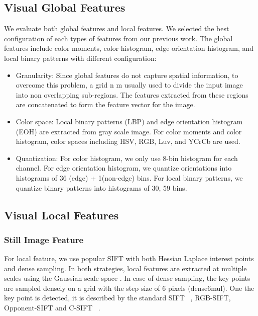 \documentclass[twocolumn]{bmcart}%
\begin{document}
\subsection{Visual Global Features}

We evaluate both global features and local features. We selected the best configuration of each types of features from our previous work\cite{lam2012nii}. The global features include color moments, color histogram, edge orientation histogram, and local binary patterns with different configuration:

\begin{itemize}
	\item Granularity:  Since global features do not capture spatial information, to overcome this problem, a grid n  m usually used to divide the input image into non overlapping sub-regions. The features extracted from these regions are concatenated to form the feature vector for the image.
	\item Color space: Local binary patterns (LBP) and edge orientation histogram (EOH) are extracted from gray scale image. For color moments and color histogram, color spaces including HSV, RGB, Luv, and YCrCb are used.
	\item Quantization: For color histogram, we only use 8-bin histogram for each channel. For edge orientation histogram, we quantize orientations into histograms of 36 (edge) + 1(non-edge) bins. For local binary patterns, we quantize binary patterns into histograms of 30, 59 bins.
\end{itemize}

\subsection{Visual Local Features}
\subsubsection{Still Image Feature}

For local feature, we use popular SIFT with both Hessian Laplace interest points \cite{mikolajczyk2002affine} and dense sampling. In both strategies, local features are extracted at multiple scales using the Gaussian scale space \cite{mikolajczyk2002affine}. In case of dense sampling, the key points are sampled densely on a grid with the step size of 6 pixels (dense6mul). One the key point is detected, it is described by the standard SIFT ~\cite{lowe2004distinctive}, RGB-SIFT, Opponent-SIFT and C-SIFT ~\cite{burghouts2009performance}.
\end{document}

